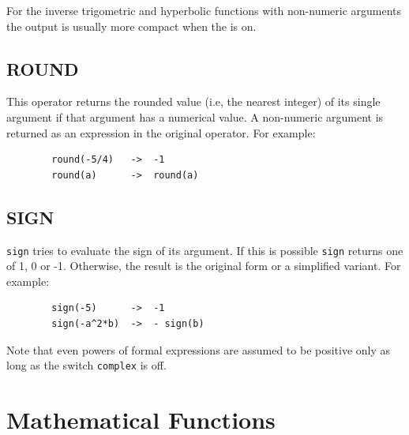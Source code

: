 For the inverse trigometric and hyperbolic functions with non-numeric arguments the output is usually more compact when the  is on.

\subsection{ROUND}
\hypertarget{operator:ROUND}{}
This operator returns the rounded value (i.e, the nearest integer) of its
single argument if that argument has a numerical value.  A non-numeric
argument is returned as an expression in the original operator.  For
example:
\begin{verbatim}
        round(-5/4)   ->  -1
        round(a)      ->  round(a)
\end{verbatim}

\subsection{SIGN}
\hypertarget{operator:SIGN}{}
\texttt{sign} tries to evaluate the sign of its argument. If this
is possible \texttt{sign} returns one of 1, 0 or -1.  Otherwise, the result
is the original form or a simplified variant. For example:
\begin{verbatim}
        sign(-5)      ->  -1
        sign(-a^2*b)  ->  - sign(b)
\end{verbatim}
Note that even powers of formal expressions are assumed to be
positive only as long as the switch \texttt{complex} is off.

\section{Mathematical Functions}
\hypertarget{operator:ACOS}{}
\hypertarget{operator:ACOSD}{}
\hypertarget{operator:ACOSH}{}
\hypertarget{operator:ACOT}{}
\hypertarget{operator:ACOTD}{}
\hypertarget{operator:ACOTH}{}
\hypertarget{operator:ACSC}{}
\hypertarget{operator:ACSCD}{}
\hypertarget{operator:ACSCH}{}
\hypertarget{operator:ASEC}{}
\hypertarget{operator:ASECD}{}
\hypertarget{operator:ASECH}{}
\hypertarget{operator:ASIN}{}
\hypertarget{operator:ASIND}{}
\hypertarget{operator:ASINH}{}
\hypertarget{operator:ATAN}{}
\hypertarget{operator:ATAND}{}
\hypertarget{operator:ATANH}{}
\hypertarget{operator:ATAN2}{}
\hypertarget{operator:ATAN2D}{}
\hypertarget{operator:COS}{}
\hypertarget{operator:COSD}{}
\hypertarget{operator:COSH}{}
\hypertarget{operator:COT}{}
\hypertarget{operator:COTD}{}
\hypertarget{operator:COTH}{}
\hypertarget{operator:CSC}{}
\hypertarget{operator:CSCD}{}
\hypertarget{operator:CSCH}{}
\hypertarget{operator:EXP}{}
\hypertarget{operator:HYPOT}{}
\hypertarget{operator:LOG}{}
\hypertarget{operator:LOGB}{}
\hypertarget{operator:LOG10}{}
\hypertarget{operator:SEC}{}
\hypertarget{operator:SECD}{}
\hypertarget{operator:SECH}{}
\hypertarget{operator:SIN}{}
\hypertarget{operator:SIND}{}
\hypertarget{operator:SINH}{}
\hypertarget{operator:SQRT}{}
\hypertarget{operator:TAN}{}
\hypertarget{operator:TAND}{}
\hypertarget{operator:TANH}{}
\hypertarget{operator:NORM}{}
\hypertarget{operator:ARG}{}
\hypertarget{operator:ARGD}{}
\hypertarget{operator:LN}{}

